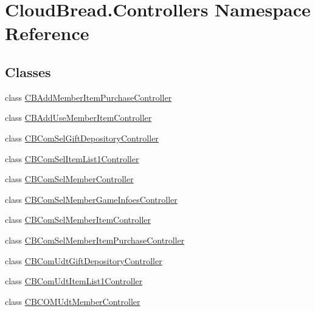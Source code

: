 \hypertarget{namespace_cloud_bread_1_1_controllers}{}\section{Cloud\+Bread.\+Controllers Namespace Reference}
\label{namespace_cloud_bread_1_1_controllers}
\subsection*{Classes}
\begin{DoxyCompactItemize}
\item 
class \hyperlink{class_cloud_bread_1_1_controllers_1_1_c_b_add_member_item_purchase_controller}{C\+B\+Add\+Member\+Item\+Purchase\+Controller}
\item 
class \hyperlink{class_cloud_bread_1_1_controllers_1_1_c_b_add_use_member_item_controller}{C\+B\+Add\+Use\+Member\+Item\+Controller}
\item 
class \hyperlink{class_cloud_bread_1_1_controllers_1_1_c_b_com_sel_gift_depository_controller}{C\+B\+Com\+Sel\+Gift\+Depository\+Controller}
\item 
class \hyperlink{class_cloud_bread_1_1_controllers_1_1_c_b_com_sel_item_list1_controller}{C\+B\+Com\+Sel\+Item\+List1\+Controller}
\item 
class \hyperlink{class_cloud_bread_1_1_controllers_1_1_c_b_com_sel_member_controller}{C\+B\+Com\+Sel\+Member\+Controller}
\item 
class \hyperlink{class_cloud_bread_1_1_controllers_1_1_c_b_com_sel_member_game_infoes_controller}{C\+B\+Com\+Sel\+Member\+Game\+Infoes\+Controller}
\item 
class \hyperlink{class_cloud_bread_1_1_controllers_1_1_c_b_com_sel_member_item_controller}{C\+B\+Com\+Sel\+Member\+Item\+Controller}
\item 
class \hyperlink{class_cloud_bread_1_1_controllers_1_1_c_b_com_sel_member_item_purchase_controller}{C\+B\+Com\+Sel\+Member\+Item\+Purchase\+Controller}
\item 
class \hyperlink{class_cloud_bread_1_1_controllers_1_1_c_b_com_udt_gift_depository_controller}{C\+B\+Com\+Udt\+Gift\+Depository\+Controller}
\item 
class \hyperlink{class_cloud_bread_1_1_controllers_1_1_c_b_com_udt_item_list1_controller}{C\+B\+Com\+Udt\+Item\+List1\+Controller}
\item 
class \hyperlink{class_cloud_bread_1_1_controllers_1_1_c_b_c_o_m_udt_member_controller}{C\+B\+C\+O\+M\+Udt\+Member\+Controller}

\end{DoxyCompactItemize}
